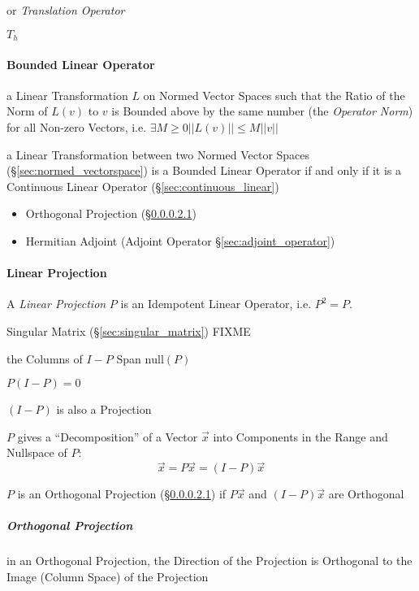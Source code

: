 or \emph{Translation Operator}

$T_h$



\paragraph{Bounded Linear Operator}\label{sec:bounded_linear_operator}\hfill

a Linear Transformation $L$ on Normed Vector Spaces such that the Ratio of the
Norm of $L(v)$ to $v$ is Bounded above by the same number (the \emph{Operator
  Norm}) for all Non-zero Vectors, i.e. $\exists M \geq 0 ||L(v)|| \leq M||v||$

a Linear Transformation between two Normed Vector Spaces
(\S\ref{sec:normed_vectorspace}) is a Bounded Linear Operator if and
only if it is a Continuous Linear Operator
(\S\ref{sec:continuous_linear})

\begin{itemize}
  \item Orthogonal Projection (\S\ref{sec:orthogonal_projection})
  \item Hermitian Adjoint (Adjoint Operator \S\ref{sec:adjoint_operator})
\end{itemize}



\paragraph{Linear Projection}\label{sec:projection}\hfill

A \emph{Linear Projection} $P$ is an Idempotent Linear Operator, i.e. $P^2 = P$.

Singular Matrix (\S\ref{sec:singular_matrix}) FIXME

the Columns of $I - P$ Span $\mathrm{null}(P)$

$P(I - P) = 0$

$(I - P)$ is also a Projection

$P$ gives a ``Decomposition'' of a Vector $\vec{x}$ into Components in the
Range and Nullspace of $P$:
\[
  \vec{x} = P\vec{x} = (I - P)\vec{x}
\]

$P$ is an Orthogonal Projection (\S\ref{sec:orthogonal_projection}) if
$P\vec{x}$ and $(I-P)\vec{x}$ are Orthogonal



\subparagraph{Orthogonal Projection}\label{sec:orthogonal_projection}\hfill

in an Orthogonal Projection, the Direction of the Projection is Orthogonal to
the Image (Column Space) of the Projection

